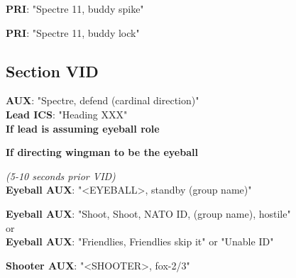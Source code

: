 \textbf{PRI}: "Spectre 11, buddy spike"

\textbf{PRI}: "Spectre 11, buddy lock"

\newpage

\subsection*{Section VID}

\textbf{AUX}: "Spectre, defend (cardinal direction)"\\
\textbf{Lead ICS}: "Heading XXX"\\

\textbf{If lead is assuming eyeball role}

\textbf{If directing wingman to be the eyeball}

\textit{(5-10 seconds prior VID)}\\
\textbf{Eyeball AUX}: "<EYEBALL>, standby (group name)"

\textbf{Eyeball AUX}: "Shoot, Shoot, NATO ID, (group name), hostile"\\
or\\
\textbf{Eyeball AUX}: "Friendlies, Friendlies skip it" or "Unable ID"

\textbf{Shooter AUX}: "<SHOOTER>, fox-2/3"

